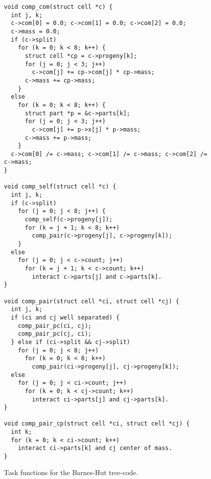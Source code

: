 \documentclass[preprint]{elsarticle}
\begin{document}
\begin{figure}
\begin{center}\begin{minipage}{0.9\textwidth}
    \begin{lstlisting}[basicstyle=\scriptsize\tt]
void comp_com(struct cell *c) {
  int j, k;
  c->com[0] = 0.0; c->com[1] = 0.0; c->com[2] = 0.0;
  c->mass = 0.0;
  if (c->split)
    for (k = 0; k < 8; k++) {
      struct cell *cp = c->progeny[k];
      for (j = 0; j < 3; j++)
        c->com[j] += cp->com[j] * cp->mass;
      c->mass += cp->mass;
    }
  else
    for (k = 0; k < 8; k++) {
      struct part *p = &c->parts[k];
      for (j = 0; j < 3; j++)
        c->com[j] += p->x[j] * p->mass;
      c->mass += p->mass;
    }
  c->com[0] /= c->mass; c->com[1] /= c->mass; c->com[2] /= c->mass;
}

void comp_self(struct cell *c) {
  int j, k;
  if (c->split)
    for (j = 0; j < 8; j++) {
      comp_self(c->progeny[j]);
      for (k = j + 1; k < 8; k++)
        comp_pair(c->progeny[j], c->progeny[k]);
    }
  else
    for (j = 0; j < c->count; j++)
      for (k = j + 1; k < c->count; k++)
        interact c->parts[j] and c->parts[k].
}

void comp_pair(struct cell *ci, struct cell *cj) {
  int j, k;
  if (ci and cj well separated) {
    comp_pair_pc(ci, cj);
    comp_pair_pc(cj, ci);
  } else if (ci->split && cj->split)
    for (j = 0; j < 8; j++)
      for (k = 0; k < 8; k++)
        comp_pair(ci->progeny[j], cj->progeny[k]);
  else
    for (j = 0; j < ci->count; j++)
      for (k = 0; k < cj->count; k++)
        interact ci->parts[j] and cj->parts[k].
}

void comp_pair_cp(struct cell *ci, struct cell *cj) {
  int k;
  for (k = 0; k < ci->count; k++)
    interact ci->parts[k] and cj center of mass.
}
    \end{lstlisting}
\end{minipage}\end{center}
    \caption{Task functions for the Barnes-Hut tree-code.}
    \label{fig:BHTasks}
\end{figure}
\end{document}
